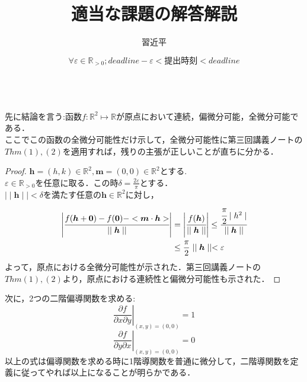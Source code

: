 \documentclass{jarticle}
\begin{document}
\title{適当な課題の解答解説}
\author{習近平}
\date{$\forall \varepsilon \in \mathbb{R}_{>0} ; deadline - \varepsilon < \text{提出時刻} <deadline$}
\maketitle
\noindent
{}\\
先に結論を言う:函数$f : \mathbb{R}^2 \mapsto \mathbb{R}$が原点において連続，偏微分可能，全微分可能である．\\
ここでこの函数の全微分可能性だけ示して，全微分可能性に第三回講義ノートの
$Thm(1),(2)$を適用すれば，残りの主張が正しいことが直ちに分かる．
\begin{proof}
$\bm{h} =(h,k) \in \mathbb{R}^2 , \bm{m} = (0,0) \in \mathbb{R}^2$とする.\\
$ \varepsilon \in \mathbb{R}_{>0} $を任意に取る．この時$ \delta = \frac{2 \varepsilon }{ \pi }$とする．\\
$ \mid \mid \bm{h} \mid \mid < \delta $を満たす任意の$ \bm{h} \in \mathbb{R}^2$に対し，\\
$$
\begin{aligned}
\left| \cfrac{f(\bm{h}+\bm{0})-f(\bm{0}) - < \bm{m} \cdot \bm{h}>}{ \mid \mid \bm{h} \mid \mid } \right| & = \left| \cfrac{f(\bm{h})}{\mid \mid \bm{h} \mid \mid} \right|  \le  \cfrac{\cfrac{\pi}{2} \mid h^2 \mid }{\mid \mid \bm{h} \mid \mid } \\								       
& \le  \frac{\pi}{2}\mid \mid \bm{h} \mid \mid	 <  \varepsilon
\end{aligned}
$$
よって，原点における全微分可能性が示された．第三回講義ノートの$Thm(1),(2)$より，原点における連続性と偏微分可能性も示された．
\end{proof}
次に，2つの二階偏導関数を求める:\\
$$
\left. \frac{\partial f}{\partial x \partial y}\right|_{(x,y)=(0,0)}=1
$$
$$
\left. \frac{\partial f}{\partial y \partial x}\right|_{(x,y)=(0,0)}=0
$$
以上の式は偏導関数を求める時に1階導関数を普通に微分して，二階導関数を定義に従ってやれば以上になることが明らかである．\\
\\
\noindent {}
\end{document}
